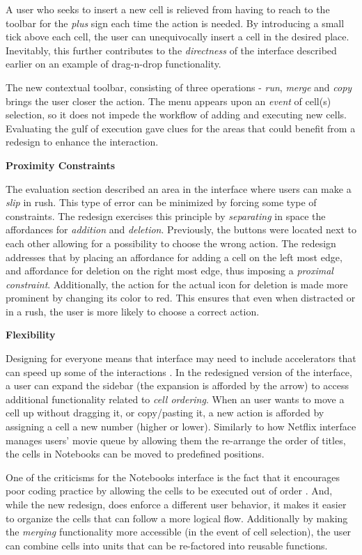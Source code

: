 \documentclass[12pt,letterpaper]{article}
\begin{document}
A user who seeks to insert a new cell is relieved from having to reach to the toolbar for the \textit{plus} sign each time the action is needed. By introducing a small tick above each cell, the user can unequivocally insert a cell in the desired place. Inevitably, this further contributes to the \textit{directness} of the interface described earlier on an example of drag-n-drop functionality. 

The new contextual toolbar, consisting of three operations - \textit{run}, \textit{merge} and \textit{copy} brings the user closer the action. The menu appears upon an \textit{event} of cell(s) selection, so it does not impede the workflow of adding and executing new cells. Evaluating the gulf of execution gave clues for the areas that could benefit from a redesign to enhance the interaction. 

\textbf{Proximity Constraints}

The evaluation section described an area in the interface where users can make a \textit{slip} in rush. This type of error can be minimized by forcing some type of constraints. The redesign exercises this principle by \textit{separating} in space the affordances for \textit{addition} and \textit{deletion}. Previously, the buttons were located next to each other allowing for a possibility to choose the wrong action. The redesign addresses that by placing an affordance for adding a cell on the left most edge, and affordance for deletion on the right most edge, thus imposing a \textit{proximal constraint}.  Additionally, the action for the actual icon for deletion is made more prominent by changing its color to red. This ensures that even when distracted or in a rush, the user is more likely to choose a correct action.

\textbf{Flexibility}

Designing for everyone means that interface may need to include accelerators that can speed up some of the interactions \cite{nielsen1994usability}. In the redesigned version of the interface, a user can expand the sidebar (the expansion is afforded by the arrow) to access additional functionality related to \textit{cell ordering}. When an user wants to move a cell up without dragging it, or copy/pasting it, a new action is afforded by assigning a cell a new number (higher or lower). Similarly to how Netflix interface manages users' movie queue by allowing them the re-arrange the order of titles, the cells in Notebooks can be moved to predefined positions. 

One of the criticisms for the Notebooks interface is the fact that it encourages poor coding practice by allowing the cells to be executed out of order \cite{perkel2018jupyter}. And, while the new redesign, does enforce a different user behavior, it makes it easier to organize the cells that can follow a more logical flow. Additionally by making the \textit{merging} functionality more accessible (in the event of cell selection), the user can combine cells into units that can be re-factored into reusable functions. 
\end{document}
